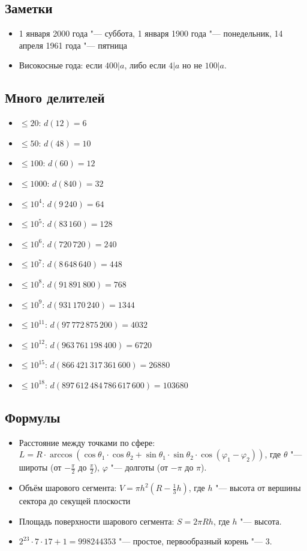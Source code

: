 \subsection{Заметки}
\begin{itemize}
\item 1 января 2000 года "--- суббота, 1 января 1900 года "--- понедельник, 14 апреля 1961 года "--- пятница
\item Високосные года: если $400 | a$, либо если $4 | a$ но не $100 | a$.
\end{itemize}

\subsection{Много делителей}

\begin{itemize}
\item $\le 20$: $d(12)=6$
\item $\le 50$: $d(48)=10$
\item $\le 100$: $d(60)=12$
\item $\le 1000$: $d(840)=32$
\item $\le 10^4$: $d(9\,240)=64$
\item $\le 10^5$: $d(83\,160)=128$
\item $\le 10^6$: $d(720\,720)=240$
\item $\le 10^7$: $d(8\,648\,640)=448$
\item $\le 10^8$: $d(91\,891\,800)=768$
\item $\le 10^9$: $d(931\,170\,240)=1344$
\item $\le 10^{11}$: $d(97\,772\,875\,200)=4032$
\item $\le 10^{12}$: $d(963\,761\,198\,400)=6720$
\item $\le 10^{15}$: $d(866\,421\,317\,361\,600)=26880$
\item $\le 10^{18}$: $d(897\,612\,484\,786\,617\,600)=103680$
\end{itemize}

\subsection{Формулы}

\begin{itemize}
\item Расстояние между точками по сфере: $L = R \cdot \arccos ( \cos \theta_1 \cdot \cos \theta_2 + \sin \theta_1 \cdot \sin \theta_2 \cdot \cos (\varphi_1 - \varphi_2) )$,
      где $\theta$ "--- широты (от $-\frac \pi 2$ до $\frac \pi 2$), $\varphi$ "--- долготы (от $-\pi$ до $\pi$).
\item Объём шарового сегмента: $V = \pi h^2 (R - \frac 1 3 h)$, где $h$ "--- высота от вершины сектора до секущей плоскости
\item Площадь поверхности шарового сегмента: $S=2\pi R h$, где $h$ "--- высота.
\item $2^{23} \cdot 7 \cdot 17 + 1 = 998244353$ "--- простое, первообразный корень "--- 3.
\end{itemize}
